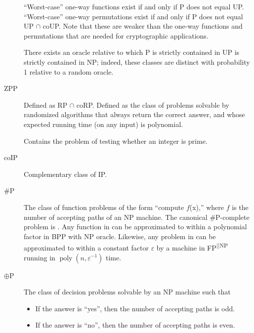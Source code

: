 \documentclass[a4paper]{article}
\newcommand{\cls}[1]{\rm{#1}}
\newcommand{\probl}[1]{\text{\textsc{#1}}}
\begin{document}
\begin{appendices}
\begin{description}
    ``Worst-case'' one-way functions exist if and only if \cls{P} does not equal \cls{UP}.  ``Worst-case'' one-way permutations exist if and only if \cls{P} does not equal \cls{UP} $\cap$ \cls{coUP}.  Note that these are weaker than the one-way functions and permutations that are needed for cryptographic applications.

    There exists an oracle relative to which \cls{P} is strictly contained in \cls{UP} is strictly contained in \cls{NP}; indeed, these classes are distinct with probability 1 relative to a random oracle.

  \item[\cls{ZPP}] Defined as \cls{RP} $\cap$ \cls{coRP}. Defined as the class of problems solvable by randomized algorithms that always return the correct answer, and whose expected running time (on any input) is polynomial.

    Contains the problem of testing whether an integer is prime.

  \item[\cls{coIP}] Complementary class of \cls{IP}.

  \item[\cls{\#P}] The class of function problems of the form ``compute $f$(x),'' where $f$ is the number of accepting paths of an NP machine. The canonical \cls{\#P}-complete problem is \probl{\#SAT}. Any function in \probl{\#P} can be approximated to within a polynomial factor in \cls{BPP} with \cls{NP} oracle. Likewise, any problem in \probl{\#P} can be approximated to within a constant factor $\varepsilon$ by a machine in FP\textsuperscript{||NP} running in $\operatorname{poly}(n,\varepsilon^{-1})$ time.
  \item[\cls{$\oplus$P}] The class of decision problems solvable by an \cls{NP} machine such that
    \begin{itemize}
      \item If the answer is ``yes'', then the number of accepting paths is odd.
      \item If the answer is ``no'', then the number of accepting paths is even.
    \end{itemize}
\end{description}


\end{appendices}
\end{document}
